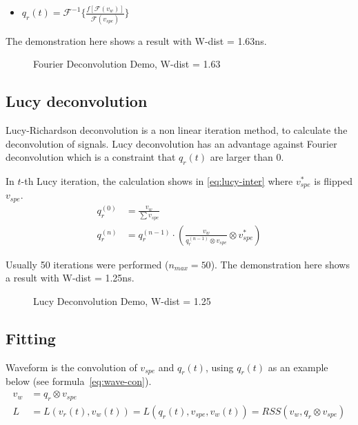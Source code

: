 \begin{itemize}
    \item $q_{r}(t) = \mathcal{F}^{-1}\{\frac{f[\mathcal{F}(v_{w})]}{\mathcal{F}(v_{spe})}\}$
\end{itemize}

The demonstration here shows a result with W-dist = 1.63ns. 

\begin{figure}[H]
    \centering
    \scalebox{0.4}{}
    \caption{Fourier Deconvolution Demo, W-dist = 1.63}
\end{figure}

\subsection{Lucy deconvolution}
Lucy-Richardson deconvolution is a non linear iteration method, to calculate the deconvolution of signals. Lucy deconvolution has an advantage against Fourier deconvolution which is a constraint that $q_{r}(t)$ are larger than 0. 

In $t$-th Lucy iteration, the calculation shows in \eqref{eq:lucy-inter} where $v^{*}_{spe}$ is flipped $v_{spe}$. 
\begin{align}
    q_{r}^{(0)} &= \frac{v_{w}}{\sum v_{spe}} \\
    q_{r}^{(n)} &= q_{r}^{(n-1)} \cdot \left(\frac{v_{w}}{q_{r}^{(n-1)} \otimes v_{spe}} \otimes v^{*}_{spe}\right) \label{eq:lucy-inter}
\end{align}

Usually 50 iterations were performed ($n_{max}=50$). The demonstration here shows a result with W-dist = 1.25ns. 

\begin{figure}[H]
    \centering
    \scalebox{0.4}{}
    \caption{Lucy Deconvolution Demo, W-dist = 1.25}
\end{figure}

\subsection{Fitting}
Waveform is the convolution of $v_{spe}$ and $q_{r}(t)$, using $q_{r}(t)$ as an example below (see formula~\eqref{eq:wave-con}). 
\begin{align}
    v_{w} &= q_{r} \otimes v_{spe} \label{eq:wave-con} \\
    L &= L(v_{r}(t), v_{w}(t)) = L(q_{r}(t), v_{spe}, v_{w}(t)) = RSS(v_{w}, q_{r} \otimes v_{spe}) \label{eq:loss-rss}
\end{align}

